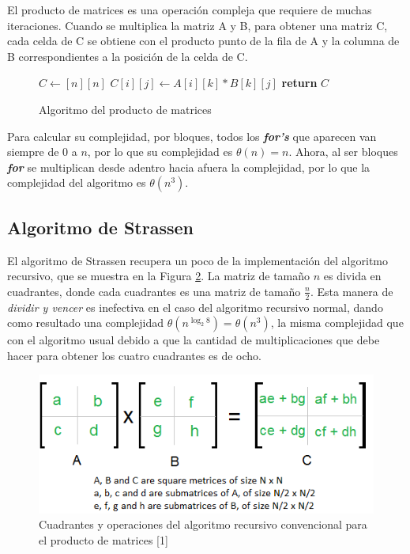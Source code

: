 \documentclass[12pt,twoside]{article}
\begin{document}
El producto de matrices es una operaci\'on compleja que requiere de muchas iteraciones. Cuando se multiplica la matriz A y B, para obtener una matriz C, cada celda de C se obtiene con el producto punto de la fila de A y la columna de B correspondientes a la posici\'on de la celda de C.

\begin{figure}[H]
    \centering
    \begin{algorithmic}
            \State $C \longleftarrow [n][n]$
                        \State $C[i][j] \longleftarrow A[i][k]*B[k][j]$
                    \EndFor
                \EndFor{}
            \EndFor
            \State \textbf{return} $C$
        \EndProcedure
    \end{algorithmic}
    \caption{Algoritmo del producto de matrices}
    \label{fig:producto}
\end{figure}

Para calcular su complejidad, por bloques, todos los \textit{\textbf{for's}} que aparecen van siempre de $0$ a $n$, por lo que su complejidad es $\theta(n) = n$. Ahora, al ser bloques \textit{\textbf{for}} se multiplican desde adentro hacia afuera la complejidad, por lo que la complejidad del algoritmo es $\theta(n^3)$.

\subsection{Algoritmo de Strassen}

El algoritmo de Strassen recupera un poco de la implementaci\'on del algoritmo recursivo, que se muestra en la Figura \ref{fig:strassen_new}. La matriz de tama\~no $n$ es divida en cuadrantes, donde cada cuadrantes es una matriz de tama\~no $\frac{n}{2}$. Esta manera de \textit{dividir y vencer} es inefectiva en el caso del algoritmo recursivo normal, dando como resultado una complejidad $\theta(n^{\log_2{8}}) = \theta(n^3)$, la misma complejidad que con el algoritmo usual debido a que la cantidad de multiplicaciones que debe hacer para obtener los cuatro cuadrantes es de ocho.
\begin{figure}[H]
    \centering
    \includegraphics{strassen_new.png}
    \caption{Cuadrantes y operaciones del algoritmo recursivo convencional para el producto de matrices [1]}
    \label{fig:strassen_new}
\end{figure}
\end{document}
